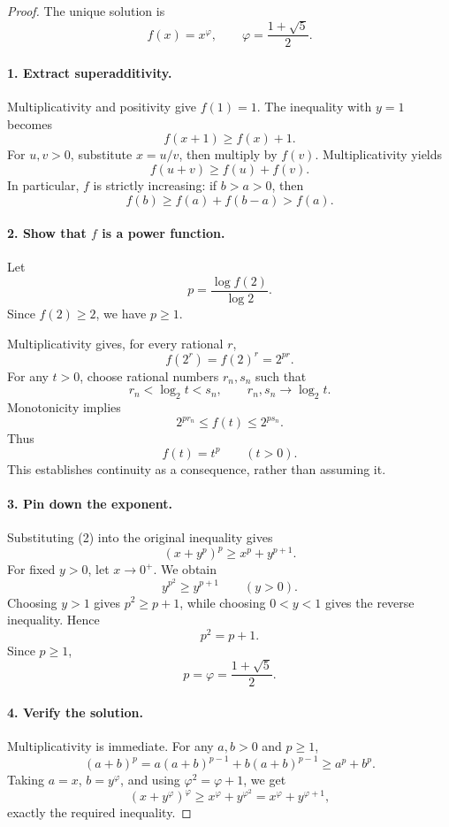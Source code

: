 
\begin{dlsummary}[title={\bfseries Solution 44. The Hidden Golden Exponent},breakable]

\begin{proof}
The unique solution is
\[
\boxed{
f(x)=x^\varphi,\qquad
\varphi=\frac{1+\sqrt5}{2}.
}
\]

\paragraph{1. Extract superadditivity.}

Multiplicativity and positivity give \(f(1)=1\). The inequality with \(y=1\) becomes
\[
f(x+1)\ge f(x)+1.
\]
For \(u,v>0\), substitute \(x=u/v\), then multiply by \(f(v)\). Multiplicativity yields
\[
\boxed{f(u+v)\ge f(u)+f(v).} \tag{1}
\]
In particular, \(f\) is strictly increasing: if \(b>a>0\), then
\[
f(b)\ge f(a)+f(b-a)>f(a).
\]

\paragraph{2. Show that \(f\) is a power function.}

Let
\[
p=\frac{\log f(2)}{\log2}.
\]
Since \(f(2)\ge2\), we have \(p\ge1\).

Multiplicativity gives, for every rational \(r\),
\[
f(2^r)=f(2)^r=2^{pr}.
\]
For any \(t>0\), choose rational numbers \(r_n,s_n\) such that
\[
r_n<\log_2t<s_n,
\qquad r_n,s_n\longrightarrow\log_2t.
\]
Monotonicity implies
\[
2^{pr_n}\le f(t)\le2^{ps_n}.
\]
Thus
\[
\boxed{f(t)=t^p\qquad(t>0).} \tag{2}
\]
This establishes continuity as a consequence, rather than assuming it.

\paragraph{3. Pin down the exponent.}

Substituting (2) into the original inequality gives
\[
(x+y^p)^p\ge x^p+y^{p+1}.
\]
For fixed \(y>0\), let \(x\to0^+\). We obtain
\[
y^{p^2}\ge y^{p+1}\qquad(y>0).
\]
Choosing \(y>1\) gives \(p^2\ge p+1\), while choosing \(0<y<1\) gives the reverse inequality. Hence
\[
p^2=p+1.
\]
Since \(p\ge1\),
\[
p=\varphi=\frac{1+\sqrt5}{2}.
\]

\paragraph{4. Verify the solution.}

Multiplicativity is immediate. For any \(a,b>0\) and \(p\ge1\),
\[
(a+b)^p
=a(a+b)^{p-1}+b(a+b)^{p-1}
\ge a^p+b^p.
\]
Taking \(a=x\), \(b=y^\varphi\), and using \(\varphi^2=\varphi+1\), we get
\[
(x+y^\varphi)^\varphi
\ge x^\varphi+y^{\varphi^2}
=x^\varphi+y^{\varphi+1},
\]
exactly the required inequality.
\end{proof}
\end{dlsummary}

